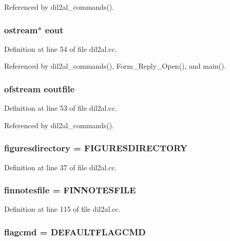 Referenced by dil2al\_\-commands().
\subsubsection{\setlength{\rightskip}{0pt plus 5cm}ostream$\ast$ eout}\label{dil2al_8cc_a28}




Definition at line 54 of file dil2al.cc.

Referenced by dil2al\_\-commands(), Form\_\-Reply\_\-Open(), and main().
\subsubsection{\setlength{\rightskip}{0pt plus 5cm}ofstream eoutfile}\label{dil2al_8cc_a27}




Definition at line 53 of file dil2al.cc.

Referenced by dil2al\_\-commands().
\subsubsection{ figuresdirectory = FIGURESDIRECTORY}\label{dil2al_8cc_a11}




Definition at line 37 of file dil2al.cc.
\subsubsection{ finnotesfile = FINNOTESFILE}\label{dil2al_8cc_a89}




Definition at line 115 of file dil2al.cc.
\subsubsection{ flagcmd = DEFAULTFLAGCMD}\label{dil2al_8cc_a85}




